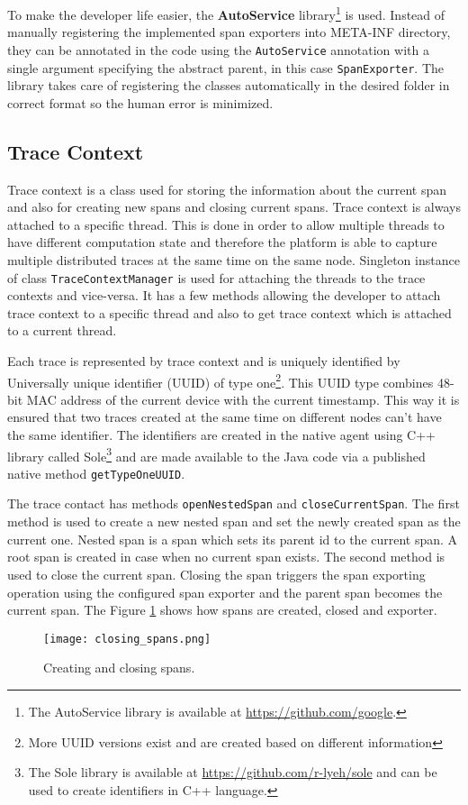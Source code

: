 To make the developer life easier, the \textbf{AutoService} library\footnote{The AutoService library is available at \url{https://github.com/google}.} is used. Instead of manually registering the implemented span exporters into META-INF directory, they can be annotated in the code using the \texttt{AutoService} annotation with a single argument specifying the abstract parent, in this case \texttt{SpanExporter}. The library takes care of registering the classes automatically in the desired folder in correct format so the human error is minimized.

\subsection{Trace Context}
Trace context is a class used for storing the information about the current span and also for creating new spans and closing current spans. Trace context is always attached to a specific thread. This is done in order to allow multiple threads to have different computation state and therefore the platform is able to capture multiple distributed traces at the same time on the same node. Singleton instance of class \texttt{TraceContextManager} is used for attaching the threads to the trace contexts and vice-versa. It has a few methods allowing the developer to attach trace context to a specific thread and also to get trace context which is attached to a current thread.

Each trace is represented by trace context and is uniquely identified by Universally unique identifier (UUID) of type one\footnote{More UUID versions exist and are created based on different information}. This UUID type combines 48-bit MAC address of the current device with the current timestamp. This way it is ensured that two traces created at the same time on different nodes can't have the same identifier. The identifiers are created in the native agent using C++ library called Sole\footnote{The Sole library is available at \url{https://github.com/r-lyeh/sole} and can be used to create identifiers in C++ language.} and are made available to the Java code via a published native method \texttt{getTypeOneUUID}.

The trace contact has methods \texttt{openNestedSpan} and \texttt{closeCurrentSpan}. The first method is used to create a new nested span and set the newly created span as the current one. Nested span is a span which sets its parent id to the current span. A root span is created in case when no current span exists. The second method is used to close the current span. Closing the span triggers the span exporting operation using the configured span exporter and the parent span becomes the current span. The Figure \ref{fig:closing_spans} shows how spans are created, closed and exporter. \begin{figure}
	\centering
	\texttt{[image: closing\_spans.png]}
	\caption{Creating and closing spans.}
	\label{fig:closing_spans}
\end{figure}

